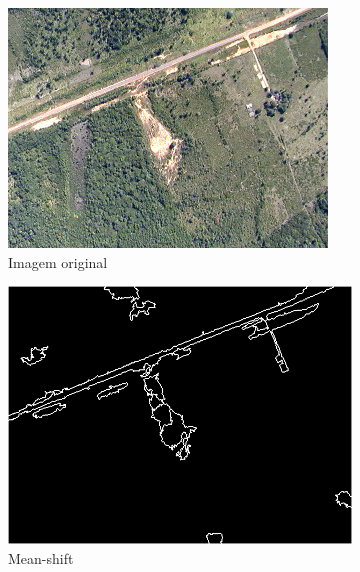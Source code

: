 \begin{figure}[htb]
	\centering
	\begin{minipage}[l]{0.32\linewidth}
		\begin{subfigure}[b]{\linewidth}
			\includegraphics[width=\linewidth]{imgs/seg_original}
			\caption{Imagem original}
		\end{subfigure}%
	\end{minipage}
	\begin{minipage}[r]{\linewidth}
		\begin{subfigure}{.32\linewidth}
			\includegraphics[width=\linewidth]{imgs/seg_meanshift}
			\caption{Mean-shift}
		\end{subfigure}
		\begin{subfigure}{.32\linewidth}

\end{subfigure}
\end{minipage}
\end{figure}
